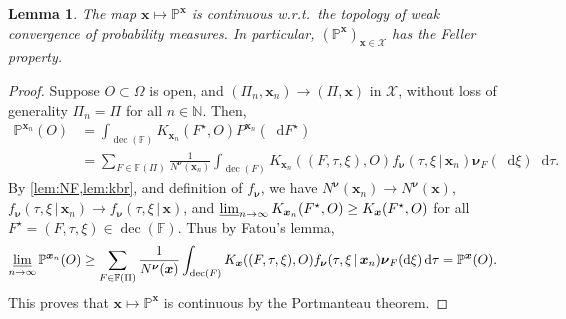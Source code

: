 \documentclass[reqno,draft]{amsart}
\numberwithin{equation}{section}
\theoremstyle{plain}
\newtheorem{lemma}[theorem]{Lemma}
\theoremstyle{remark}
\newcommand{\N}{\mathbb{N}} %
\renewcommand{\P}{\mathbb{P}} %
\newcommand*\diff{\mathop{}\!\mathrm{d}}
\newcommand{\fpart}{\Pi} %
\DeclareMathOperator{\dcb}{dec}
\newcommand{\kbr}{K} %
\newcommand{\fnu}{f_{\boldsymbol \nu}}
\begin{document}
\begin{lemma}\label{lem:strongmarkov}
    The map $\boldsymbol x \mapsto \P^{\boldsymbol x}$ is continuous w.r.t.\ the topology of weak convergence of probability measures. In particular, $(\P^{\boldsymbol x})_{\boldsymbol x\in \mathcal{X}}$ has the Feller property.
\end{lemma}
\begin{proof}
    Suppose $O\subset \Omega$ is open, and $(\fpart_n,\boldsymbol x_n) \to (\fpart,\boldsymbol x)$ in $\mathcal{X}$, without loss of generality $\fpart_n = \fpart$ for all $n\in \N$. Then,
    \begin{align*}
        \P^{\boldsymbol x_n}(O)
        &= \int_{\dcb(\mathbb{F})} \kbr_{\boldsymbol x_n}(F^\star,O) P^{\boldsymbol x_n}(\diff F^\star)\\
        &= \sum_{F\in \mathbb{F}(\fpart)} \frac{1}{N^{\boldsymbol \nu}(\boldsymbol x_n)} \int_{\dcb(F)} \kbr_{\boldsymbol x_n}((F,\tau,\xi),O) \fnu(\tau,\xi \,\vert\,\boldsymbol x_n) \boldsymbol \nu_F(\diff \xi) \diff \tau.
    \end{align*}
    By \cref{lem:NF,lem:kbr}, and definition of $\fnu$, we have $N^{\boldsymbol \nu}(\boldsymbol x_n) \to N^{\boldsymbol \nu}(\boldsymbol x)$, $\fnu(\tau,\xi \,\vert\,\boldsymbol x_n) \to \fnu(\tau,\xi \,\vert\,\boldsymbol x)$, and $\varliminf_{n\to \infty} K_{\boldsymbol x_n}(F^\star,O) \ge K_{\boldsymbol x}(F^\star,O)$ for all $F^\star = (F,\tau,\xi) \in \dcb(\mathbb{F})$. Thus by Fatou's lemma,
    \begin{align*}
        \varliminf_{n\to \infty} \P^{\boldsymbol x_n}(O)
        &\ge \sum_{F\in \mathbb{F}(\fpart)} \frac{1}{N^{\boldsymbol \nu}(\boldsymbol x)} \int_{\dcb(F)} K_{\boldsymbol x}((F,\tau,\xi),O) \fnu(\tau,\xi \,\vert\,\boldsymbol x_n)\boldsymbol \nu_F(\diff \xi)\diff \tau
        = \P^{\boldsymbol x}(O).
    \end{align*}
    This proves that $\boldsymbol x \mapsto \P^{\boldsymbol x}$ is continuous by  the Portmanteau theorem.
\end{proof}
\end{document}

